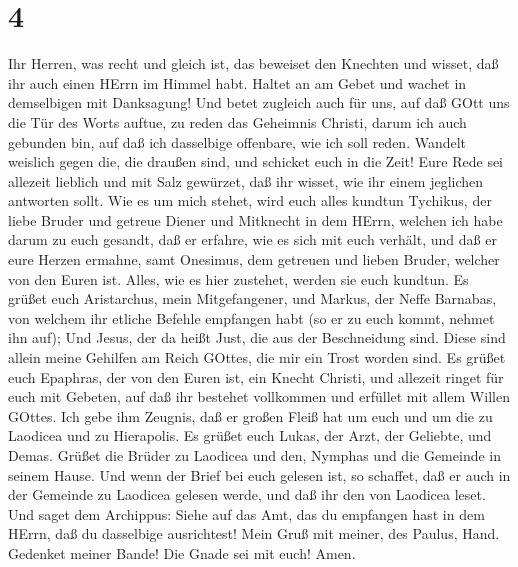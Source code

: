 \hypertarget{section-3}{%
\section{4}\label{section-3}}

 Ihr Herren, was recht und gleich ist, das beweiset den
Knechten und wisset, daß ihr auch einen HErrn im Himmel habt.
 Haltet an am Gebet und wachet in demselbigen mit
Danksagung!  Und betet zugleich auch für uns, auf daß GOtt
uns die Tür des Worts auftue, zu reden das Geheimnis Christi, darum ich
auch gebunden bin,  auf daß ich dasselbige offenbare, wie
ich soll reden.  Wandelt weislich gegen die, die draußen
sind, und schicket euch in die Zeit!  Eure Rede sei allezeit
lieblich und mit Salz gewürzet, daß ihr wisset, wie ihr einem jeglichen
antworten sollt.  Wie es um mich stehet, wird euch alles
kundtun Tychikus, der liebe Bruder und getreue Diener und Mitknecht in
dem HErrn,  welchen ich habe darum zu euch gesandt, daß er
erfahre, wie es sich mit euch verhält, und daß er eure Herzen ermahne,
 samt Onesimus, dem getreuen und lieben Bruder, welcher von
den Euren ist. Alles, wie es hier zustehet, werden sie euch kundtun.
 Es grüßet euch Aristarchus, mein Mitgefangener, und
Markus, der Neffe Barnabas, von welchem ihr etliche Befehle empfangen
habt (so er zu euch kommt, nehmet ihn auf);  Und Jesus, der
da heißt Just, die aus der Beschneidung sind. Diese sind allein meine
Gehilfen am Reich GOttes, die mir ein Trost worden sind. 
Es grüßet euch Epaphras, der von den Euren ist, ein Knecht Christi, und
allezeit ringet für euch mit Gebeten, auf daß ihr bestehet vollkommen
und erfüllet mit allem Willen GOttes.  Ich gebe ihm
Zeugnis, daß er großen Fleiß hat um euch und um die zu Laodicea und zu
Hierapolis.  Es grüßet euch Lukas, der Arzt, der Geliebte,
und Demas.  Grüßet die Brüder zu Laodicea und den, Nymphas
und die Gemeinde in seinem Hause.  Und wenn der Brief bei
euch gelesen ist, so schaffet, daß er auch in der Gemeinde zu Laodicea
gelesen werde, und daß ihr den von Laodicea leset.  Und
saget dem Archippus: Siehe auf das Amt, das du empfangen hast in dem
HErrn, daß du dasselbige ausrichtest!  Mein Gruß mit
meiner, des Paulus, Hand. Gedenket meiner Bande! Die Gnade sei mit euch!
Amen.
